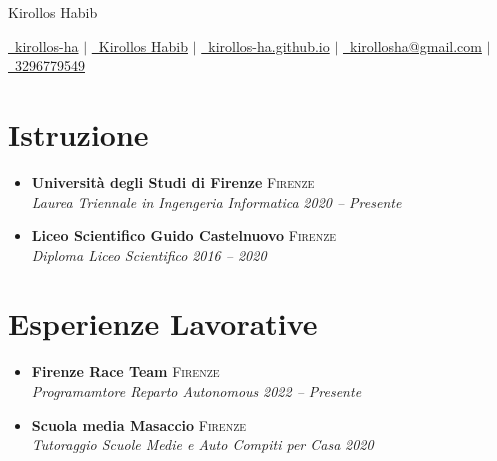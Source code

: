\documentclass[a4paper,12pt]{article}
\begin{document}
\pagestyle{empty} 


\begin{center}
\Huge{Kirollos Habib}
\end{center}

\vspace{7.5pt}

\begin{center}
  \href{https://github.com/kirollos-ha}
  {\raisebox{-0.05\height}\faGithub\ kirollos-ha} $|$
  \href{https://www.linkedin.com/in/kirollos-habib-79154b270/}
  {\raisebox{-0.05\height}\faLinkedin\ Kirollos Habib} $|$
  \href{https://kirollos-ha.github.io}
  {\raisebox{-0.05\height}\faGlobe \ kirollos-ha.github.io} $|$
  \href{mailto:kirollosha@gmail.com}
  {\raisebox{-0.05\height}\faEnvelope \ kirollosha@gmail.com}  $|$
  \href{tel:+393296779549}
  {\raisebox{-0.05\height}\faMobile \ 3296779549}
\end{center}

\section{Istruzione}
\begin{itemize}
  \item \textbf{Università degli Studi di Firenze} \hfill \textsc{Firenze} \\ \textit{Laurea Triennale in Ingengeria Informatica} \hfill \textit{2020 -- Presente}
  \item \textbf{Liceo Scientifico Guido Castelnuovo} \hfill \textsc{Firenze} \\ \textit{Diploma Liceo Scientifico} \hfill \textit{2016 -- 2020}
\end{itemize}

\section{Esperienze Lavorative}
\begin{itemize}
  \item \textbf{Firenze Race Team} \hfill \textsc{Firenze} \\ \textit{Programamtore Reparto Autonomous} \hfill \textit{2022 -- Presente}
  \item \textbf{Scuola media Masaccio} \hfill \textsc{Firenze} \\ \textit{Tutoraggio Scuole Medie e Auto Compiti per Casa} \hfill \textit{2020}
\end{itemize}
\end{document}
